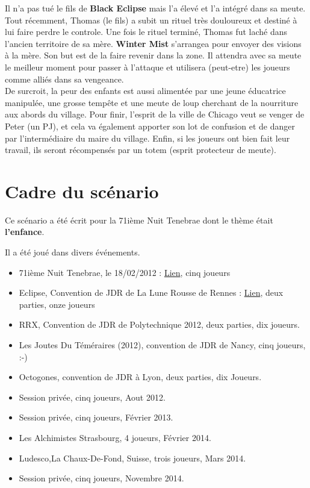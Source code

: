 \documentclass[oneside,12pt]{book}
\newcommand{\BlackEclipse}{\textbf{Black Eclipse} }
\newcommand{\Winter}{\textbf{Winter Mist} }
\begin{document}
\begin{flushleft}
Il n'a pas tué le fils de \BlackEclipse mais l'a élevé et l'a intégré dans sa meute. \\
Tout récemment, Thomas (le fils) a subit un rituel très douloureux et destiné à lui faire perdre le controle. Une fois le rituel terminé, Thomas fut laché dans l'ancien territoire de sa mère. 
\Winter s'arrangea pour envoyer des visions à la mère. Son but est de la faire revenir dans la zone. Il attendra avec sa meute le meilleur moment pour passer à l'attaque et utilisera (peut-etre) les joueurs comme alliés dans sa vengeance. \\
De surcroit, la peur des enfants est aussi alimentée par une jeune éducatrice manipulée, une grosse tempête et une meute de loup cherchant de la nourriture aux abords du village. 
Pour finir, l'esprit de la ville de Chicago veut se venger de Peter (un PJ), et cela va également apporter son lot de confusion et de danger par l'intermédiaire du maire du village. 
Enfin, si les joueurs ont bien fait leur travail, ils seront récompensés par un totem (esprit protecteur de meute). 


    
    
    \section{Cadre du scénario}
    Ce scénario a été écrit pour la 71ième Nuit Tenebrae dont le thème était \textbf{l'enfance}. 
    
    Il a été joué dans divers événements. 
    \begin{itemize}
    \item 71ième Nuit Tenebrae, le 18/02/2012 : \href{http://www.tenebrae-mundis.com/les-nuits-tenebrae/teaser-de-la-71e-nuit-tenebrae}{Lien}, cinq joueurs
    \item Eclipse, Convention de JDR de La Lune Rousse de Rennes : \href{http://www.ascreb.org/clubs/jdr/convention/archives/eclipse10.php}{Lien}, deux parties, onze joueurs
    \item RRX, Convention de JDR de Polytechnique 2012, deux parties, dix joueurs. 
    \item Les Joutes Du Téméraires (2012), convention de JDR de Nancy, cinq joueurs, :-)
    \item Octogones, convention de JDR à Lyon, deux parties, dix Joueurs.
    \item Session privée, cinq joueurs, Aout 2012.
    \item Session privée, cinq joueurs, Février 2013.
    \item Les Alchimistes Strasbourg, 4 joueurs, Février 2014.
    \item Ludesco,La Chaux-De-Fond, Suisse, trois joueurs, Mars 2014.
    \item Session privée, cinq joueurs, Novembre 2014.
    \end{itemize}
    

\end{flushleft}
\end{document}
